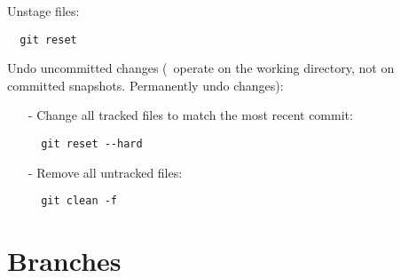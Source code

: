 \documentclass[french]{article}
\begin{document}
Unstage files:
\begin{verbatim}
  git reset
\end{verbatim}

Undo uncommitted changes (\danger\ operate on the working directory, not on committed snapshots. Permanently undo changes):
\begin{itemize}
\item [-] Change all tracked files to match the most recent commit:
\begin{verbatim}
  git reset --hard
\end{verbatim}
\item [-] Remove all untracked files:
\begin{verbatim}
  git clean -f
\end{verbatim}
\end{itemize}

\section{Branches}
\end{document}
